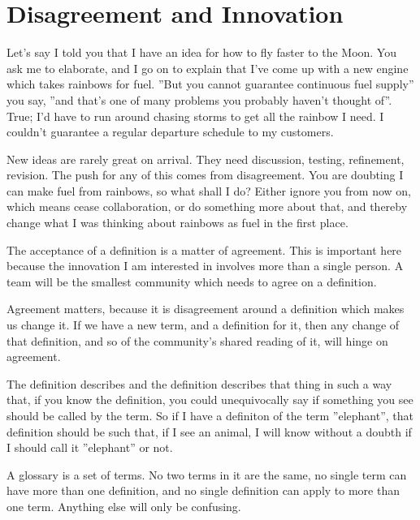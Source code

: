 \section{Disagreement and Innovation}
Let's say I told you that I have an idea for how to fly faster to the Moon. You ask me to elaborate, and I go on to explain that I've come up with a new engine which takes rainbows for fuel. ''But you cannot guarantee continuous fuel supply'' you say, ''and that's one of many problems you probably haven't thought of''. True; I'd have to run around chasing storms to get all the rainbow I need. I couldn't guarantee a regular departure schedule to my customers.

New ideas are rarely great on arrival. They need discussion, testing, refinement, revision. The push for any of this comes from disagreement. You are doubting I can make fuel from rainbows, so what shall I do? Either ignore you from now on, which means cease collaboration, or do something more about that, and thereby change what I was thinking about rainbows as fuel in the first place.











The acceptance of a definition is a matter of agreement. This is important here because the innovation I am interested in involves more than a single person. A team will be the smallest community which needs to agree on a definition. 

Agreement matters, because it is disagreement around a definition which makes us change it. If we have a new term, and a definition for it, then any change of that definition, and so of the community's shared reading of it, will hinge on agreement.




The definition describes and the definition describes that thing in such a way that, if you know the definition, you could unequivocally say if something you see should be called by the term. So if I have a definiton of the term ''elephant'', that definition should be such that, if I see an animal, I will know without a doubth if I should call it ''elephant'' or not.

A glossary is a set of terms. No two terms in it are the same, no single term can have more than one definition, and no single definition can apply to more than one term. Anything else will only be confusing.

